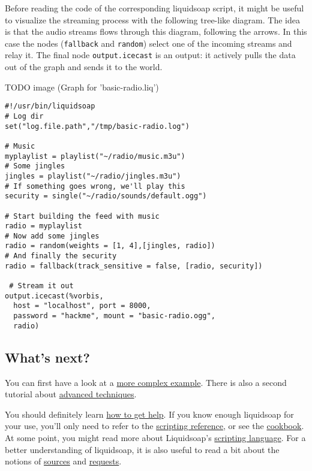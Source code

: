 Before reading the code of the corresponding liquidsoap script, it might be
useful to visualize the streaming process with the following tree-like
diagram. The idea is that the audio streams flows through this diagram,
following the arrows. In this case the nodes (\verb+fallback+ and \verb+random+)
select one of the incoming streams and relay it. The final node
\verb+output.icecast+ is an output: it actively pulls the data out of the graph
and sends it to the world.

TODO image (Graph for 'basic-radio.liq')

\begin{verbatim}
#!/usr/bin/liquidsoap
# Log dir
set("log.file.path","/tmp/basic-radio.log")

# Music
myplaylist = playlist("~/radio/music.m3u")
# Some jingles
jingles = playlist("~/radio/jingles.m3u")
# If something goes wrong, we'll play this
security = single("~/radio/sounds/default.ogg")

# Start building the feed with music
radio = myplaylist
# Now add some jingles
radio = random(weights = [1, 4],[jingles, radio])
# And finally the security
radio = fallback(track_sensitive = false, [radio, security])

 # Stream it out
output.icecast(%vorbis,
  host = "localhost", port = 8000,
  password = "hackme", mount = "basic-radio.ogg",
  radio)
\end{verbatim}

\subsection{What's next?}
You can first have a look at a \href{complete_case.html}{more complex
  example}. There is also a second tutorial about \href{advanced.html}{advanced
  techniques}.

You should definitely learn \href{help.html}{how to get help}.  If you know
enough liquidsoap for your use, you'll only need to refer to the
\href{reference.html}{scripting reference}, or see the
\href{cookbook.html}{cookbook}.  At some point, you might read more about
Liquidsoap's \href{language.html}{scripting language}.  For a better
understanding of liquidsoap, it is also useful to read a bit about the notions
of \href{sources.html}{sources} and \href{requests.html}{requests}.
